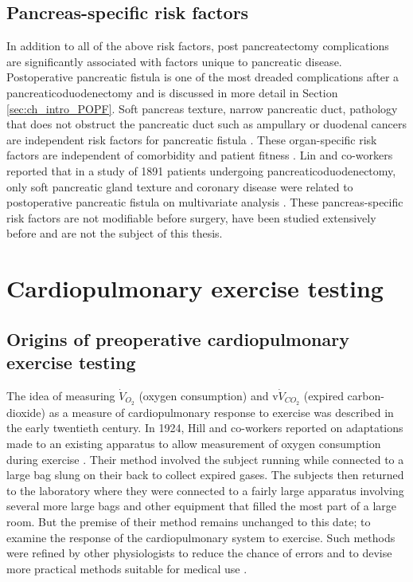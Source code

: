 \subsection{Pancreas-specific risk factors}
In addition to all of the above risk factors, post pancreatectomy complications are significantly associated with factors unique to pancreatic disease.
Postoperative pancreatic fistula is one of the most dreaded complications after a pancreaticoduodenectomy and is discussed in more detail in Section \ref{sec:ch_intro_POPF}.
Soft pancreas texture, narrow pancreatic duct, pathology that does not obstruct the pancreatic duct such as ampullary or duodenal cancers are independent risk factors for pancreatic fistula \parencite{pratt_risk_2008}.
These organ-specific risk factors are independent of comorbidity and patient fitness \parencite{deoliveira_assessment_2006}.
Lin and co-workers reported that in a study of 1891 patients undergoing pancreaticoduodenectomy, only soft pancreatic gland texture and coronary disease were related to postoperative pancreatic fistula on multivariate analysis \parencite{lin_risk_2004}.
These pancreas-specific risk factors are not modifiable before surgery, have been studied extensively before and are not the subject of this thesis.

\section{Cardiopulmonary exercise testing}

\subsection{Origins of preoperative cardiopulmonary exercise testing}

The idea of measuring $\dot{V}_{O_2}$ (oxygen consumption) and v$\dot{V}_{CO_2}$ (expired carbon-dioxide) as a measure of cardiopulmonary response to exercise was described in the early twentieth century. 
In 1924, Hill and co-workers reported on adaptations made to an existing apparatus to allow measurement of oxygen consumption during exercise \parencite{hill_muscular_1924}. 
Their method involved the subject running while connected to a large bag slung on their back to collect expired gases. 
The subjects then returned to the laboratory where they were connected to a fairly large apparatus involving several more large bags and other equipment that filled the most part of a large room. 
But the premise of their method remains unchanged to this date; to examine the response of the cardiopulmonary system to exercise.
Such methods were refined by other physiologists to reduce the chance of errors and to devise more practical methods suitable for medical use \parencite{katz_ln_metabolic_1934, sutton_estimation_1940}.

